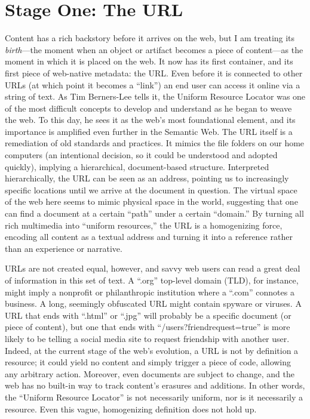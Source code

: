 \section{Stage One: The URL}

Content has a rich backstory before it arrives on the web, but I am treating its \emph{birth}---the moment when an object or artifact becomes a piece of content---as the moment in which it is placed on the web. It now has its first container, and its first piece of web-native metadata: the URL. Even before it is connected to other URLs (at which point it becomes a ``link'') an end user can access it online via a string of text. As Tim Berners-Lee tells it, the Uniform Resource Locator was one of the most difficult concepts to develop and understand as he began to weave the web.\autocite{berners-lee} To this day, he sees it as the web's most foundational element, and its importance is amplified even further in the Semantic Web. The URL itself is a remediation of old standards and practices. It mimics the file folders on our home computers (an intentional decision, so it could be understood and adopted quickly), implying a hierarchical, document-based structure. Interpreted hierarchically, the URL can be seen as an address, pointing us to increasingly specific locations until we arrive at the document in question. The virtual space of the web here seems to mimic physical space in the world, suggesting that one can find a document at a certain ``path'' under a certain ``domain.'' By turning all rich multimedia into ``uniform resources,'' the URL is a homogenizing force, encoding all content as a textual address and turning it into a reference rather than an experience or narrative.

URLs are not created equal, however, and savvy web users can read a great deal of information in this set of text. A ``.org'' top-level domain (TLD), for instance, might imply a nonprofit or philanthropic institution where a ``.com'' connotes a business. A long, seemingly obfuscated URL might contain spyware or viruses. A URL that ends with ``.html'' or ``.jpg'' will probably be a specific document (or piece of content), but one that ends with ``/users?friendrequest=true'' is more likely to be telling a social media site to request friendship with another user. Indeed, at the current stage of the web's evolution, a URL is not by definition a resource; it could yield no content and simply trigger a piece of code, allowing any arbitrary action. Moreover, even documents are subject to change, and the web has no built-in way to track content's erasures and additions. In other words, the ``Uniform Resource Locator'' is not necessarily uniform, nor is it necessarily a resource. Even this vague, homogenizing definition does not hold up.\autocite{figure here with detailed annotations of a single URL}

